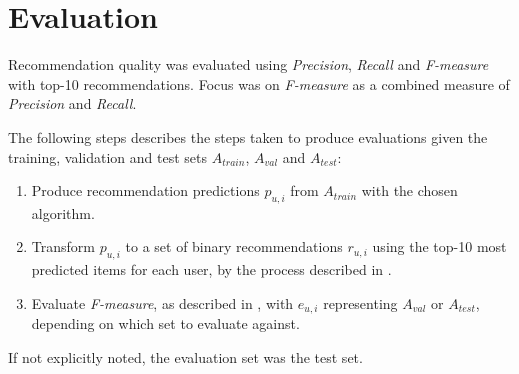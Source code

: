 
\section{Evaluation}\label{sec:method:eval}

Recommendation quality was evaluated using \textit{Precision}, \textit{Recall} and \textit{F-measure} with top-10 recommendations. Focus was on \textit{F-measure} as a combined measure of \textit{Precision} and \textit{Recall}.

The following steps describes the steps taken to produce evaluations given the training, validation and test sets $A_{train}$, $A_{val}$ and $A_{test}$:

\begin{enumerate}
    \item Produce recommendation predictions $p_{u, i}$ from $A_{train}$ with the chosen algorithm.
    \item Transform $p_{u, i}$ to a set of binary recommendations $r_{u, i}$ using the top-10 most predicted items for each user, by the process described in .
    \item Evaluate \textit{F-measure}, as described in , with $e_{u, i}$ representing $A_{val}$ or $A_{test}$, depending on which set to evaluate against.
\end{enumerate}

If not explicitly noted, the evaluation set was the test set.

